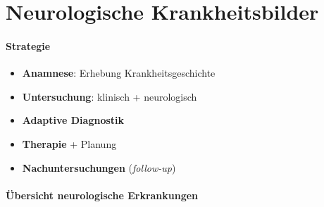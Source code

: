 \section*{Neurologische Krankheitsbilder}

\paragraph{Strategie}
\begin{itemize}
  \item \textbf{Anamnese}: Erhebung Krankheitsgeschichte
  \item \textbf{Untersuchung}: klinisch + neurologisch
  \item \textbf{Adaptive Diagnostik}
  \item \textbf{Therapie} + Planung
  \item \textbf{Nachuntersuchungen} (\emph{follow-up})
\end{itemize}

\paragraph{Übersicht neurologische Erkrankungen}

